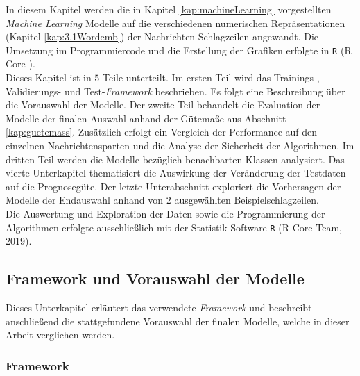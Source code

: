 \documentclass[a4paper,11pt]{article}
\begin{document}
In diesem Kapitel werden die in Kapitel \ref{kap:machineLearning} vorgestellten \textit{Machine Learning} Modelle auf die verschiedenen numerischen Repräsentationen (Kapitel \ref{kap:3.1Wordemb}) der Nachrichten-Schlagzeilen angewandt. Die Umsetzung im Programmiercode und die Erstellung der Grafiken erfolgte in \texttt{R} (R Core \cite{RCore}).\\
Dieses Kapitel ist in $5$ Teile unterteilt. Im ersten Teil wird das Trainings-, Validierungs- und Test-\textit{Framework} beschrieben. Es folgt eine Beschreibung über die Vorauswahl der Modelle. Der zweite Teil behandelt die Evaluation der Modelle der finalen Auswahl anhand der Gütemaße aus Abschnitt \ref{kap:guetemass}. Zusätzlich erfolgt ein Vergleich der Performance auf den einzelnen Nachrichtensparten und die Analyse der Sicherheit der Algorithmen.
Im dritten Teil werden die Modelle bezüglich benachbarten Klassen analysiert. Das vierte Unterkapitel thematisiert die Auswirkung der Veränderung der Testdaten auf die Prognosegüte.
Der letzte Unterabschnitt exploriert die Vorhersagen der Modelle der Endauswahl anhand von $2$ ausgewählten Beispielschlagzeilen.\\
Die Auswertung und Exploration der Daten sowie die Programmierung der Algorithmen erfolgte ausschließlich mit der Statistik-Software \texttt{R} (R Core Team, 2019).

\subsection{Framework und Vorauswahl der Modelle}

Dieses Unterkapitel erläutert das verwendete \textit{Framework} und beschreibt anschließend die stattgefundene Vorauswahl der finalen Modelle, welche in dieser Arbeit verglichen werden.

\subsubsection{Framework}
\end{document}
